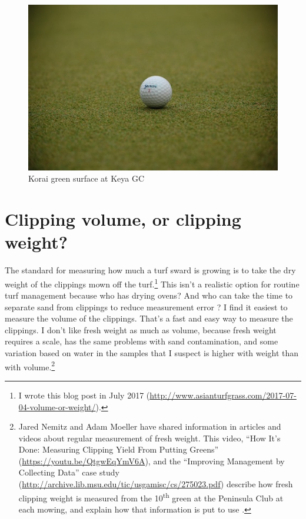 \documentclass[12pt,b5,]{tufte-book}
\begin{document}
\begin{figure}
\centering
\includegraphics{img/b2-6.png}
\caption{Korai green surface at Keya GC}
\end{figure}

\hypertarget{clipping-volume-or-clipping-weight}{%
\chapter{Clipping volume, or clipping weight?}\label{clipping-volume-or-clipping-weight}}

The standard for measuring how much a turf sward is growing is to take the dry weight of the clippings mown off the turf.\footnote{I wrote this blog post in July 2017 (\url{http://www.asianturfgrass.com/2017-07-04-volume-or-weight/}).} This isn't a realistic option for routine turf management because who has drying ovens? And who can take the time to separate sand from clippings to reduce measurement error \citep{kreuser2011}? I find it easiest to measure the volume of the clippings. That's a fast and easy way to measure the clippings. I don't like fresh weight as much as volume, because fresh weight requires a scale, has the same problems with sand contamination, and some variation based on water in the samples that I suspect is higher with weight than with volume.\footnote{Jared Nemitz and Adam Moeller have shared information in articles and videos about regular measurement of fresh weight. This video, ``How It's Done: Measuring Clipping Yield From Putting Greens'' (\url{https://youtu.be/QtgwEqYmV6A}), and the ``Improving Management by Collecting Data'' case study (\url{http://archive.lib.msu.edu/tic/usgamisc/cs/275023.pdf}) describe how fresh clipping weight is measured from the 10\textsuperscript{th} green at the Peninsula Club at each mowing, and explain how that information is put to use \citep{nemitz2016}.}
\end{document}
